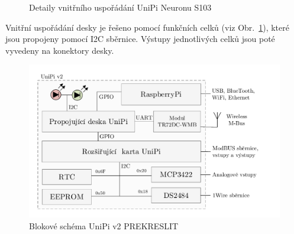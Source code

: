 \begin{figure}[!ht]
    \centering
			\hspace*{5mm}
			\caption{Detaily vnitřního uspořádání UniPi Neuronu S103}
\end{figure}

Vnitřní uspořádání desky je řešeno pomocí funkčních celků (viz Obr.~\ref{BlokUniPi2Schema}), které jsou propojeny pomocí I2C sběrnice. Výstupy jednotlivých celků jsou poté vyvedeny na konektory desky.
 \begin{figure}[!ht]
  \begin{center}
    \includegraphics[scale=0.55]{obrazky/unipi_schema2}
  \end{center}
	\caption{Blokové schéma UniPi v2 \colorbox[rgb]{1,0,0}{PREKRESLIT}}
	\label{BlokUniPi2Schema}
\end{figure}

